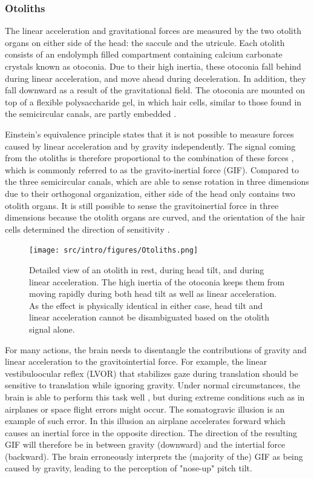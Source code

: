 \subsubsection{Otoliths}
The linear acceleration and gravitational forces are measured by the two otolith organs on either side of the head: the saccule and the utricule. Each otolith consists of an endolymph filled compartment containing calcium carbonate crystals known as otoconia. Due to their high inertia, these otoconia fall behind during linear acceleration, and move ahead during deceleration. In addition, they fall downward as a result of the gravitational field. The otoconia are mounted on top of a flexible polysaccharide gel, in which hair cells, similar to those found in the semicircular canals, are partly embedded \cite{goldberg2012}.  

Einstein's equivalence principle states that  it is not possible to measure forces caused by linear acceleration and by gravity independently. The signal coming from the otoliths is therefore proportional to the combination of these forces \cite{fernandez1976b}, which is commonly referred to as the gravito-inertial force (GIF). Compared to the three semicircular canals, which are able to sense rotation in three dimensions due to their orthogonal organization, either side of the head only contains two otolith organs. It is still possible to sense the gravitoinertial force in three dimensions because the otolith organs are curved, and the orientation of the hair cells determined the direction of sensitivity \cite{goldberg2012}.

\begin{figure}
    \texttt{[image: src/intro/figures/Otoliths.png]}
    \caption{Detailed view of an otolith  in rest,  during head tilt, and  during linear acceleration. The high inertia of the otoconia keeps them from moving rapidly during both head tilt as well as linear acceleration. As the effect is physically identical in either case, head tilt and linear acceleration cannot be disambiguated based on the otolith signal alone.}
    \label{intro:fig7}
\end{figure}

For many actions, the brain needs to disentangle the contributions of gravity and linear acceleration to the gravitointertial force. For example, the linear vestibuloocular reflex (LVOR) that stabilizes gaze during translation should be sensitive to translation while ignoring gravity. Under normal circumstances, the brain is able to perform this task well \cite{merfeld1995}, but during extreme conditions such as in airplanes or space flight errors might occur. The somatogravic illusion \cite{glasauer1995} is an example of such error. In this illusion an airplane accelerates forward which causes an inertial force in the opposite direction. The direction of the resulting GIF will therefore be in between gravity (downward) and the intertial force (backward). The brain erroneously interprets the (majority of the) GIF as being caused by gravity, leading to the perception of "nose-up" pitch tilt.

